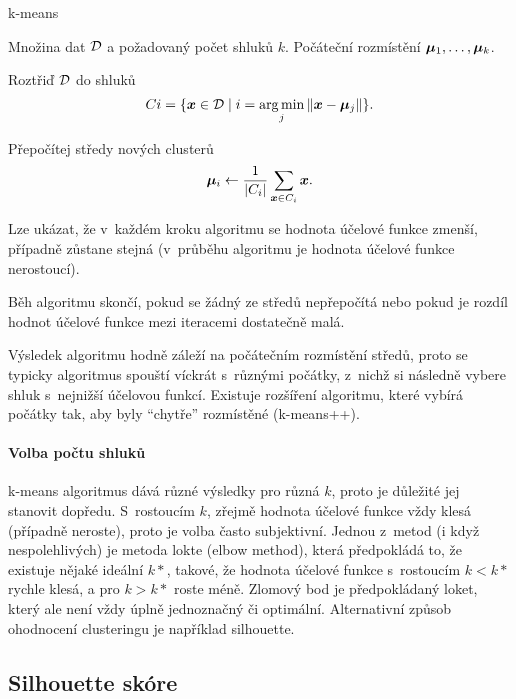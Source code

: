 \begin{algorithm}[H]
    \renewcommand{\thealgorithm}{}
    \caption{k-means}
    \begin{algorithmic}[1]
        \Require
        \Statex Množina dat $\mathcal{D}$ a požadovaný počet shluků $k$.
        \Statex Počáteční rozmístění $\bm{\mu}_1, \ldots, \bm{\mu}_k$.
        \Statex

        \State Roztřiď $\mathcal{D}$ do shluků
        \[
            Ci = \{ \bm{x} \in \mathcal{D} \mid i = \operatorname*{arg\,min}_j \| \bm{x} - \bm{\mu}_j \| \}.
        \]

        \State Přepočítej středy nových clusterů
        \[
            \bm{\mu}_i \leftarrow \frac{1}{|C_i|} \sum_{\bm{x} \in C_i} \bm{x}.
        \]
        \EndWhile
    \end{algorithmic}
\end{algorithm}

Lze ukázat, že v~každém kroku algoritmu se hodnota účelové funkce zmenší, případně zůstane stejná (v~průběhu algoritmu je hodnota účelové funkce nerostoucí).

Běh algoritmu skončí, pokud se žádný ze středů nepřepočítá nebo pokud je rozdíl hodnot účelové funkce mezi iteracemi dostatečně malá.

Výsledek algoritmu hodně záleží na počátečním rozmístění středů, proto se typicky algoritmus spouští víckrát s~různými počátky, z~nichž si následně vybere shluk s~nejnižší účelovou funkcí. Existuje rozšíření algoritmu, které vybírá počátky tak, aby byly ``chytře'' rozmístěné (k-means++).

\paragraph{Volba počtu shluků}

k-means algoritmus dává různé výsledky pro různá $k$, proto je důležité jej stanovit dopředu. S~rostoucím $k$, zřejmě hodnota účelové funkce vždy klesá (případně neroste), proto je volba často subjektivní. Jednou z~metod (i když nespolehlivých) je metoda lokte (elbow method), která předpokládá to, že existuje nějaké ideální $k*$, takové, že hodnota účelové funkce s~rostoucím $k < k*$ rychle klesá, a pro $k > k*$ roste méně. Zlomový bod je předpokládaný loket, který ale není vždy úplně jednoznačný či optimální. Alternativní způsob ohodnocení clusteringu je například silhouette.

\subsection{Silhouette skóre}

